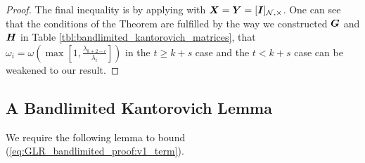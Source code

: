 \begin{proof}
The final inequality is by applying \cite[Theorem 5]{khatri1982some} with $\matr{X} = \matr{Y} = \matrsub[N,\Theta]{I}$. One can see that the conditions of the Theorem are fulfilled by the way we constructed $\bm{G}$ and $\bm{H}$ in Table \ref{tbl:bandlimited_kantorovich_matrices}, that $\omega_{i} = \omega\left(\max\left[1,\frac{\lambda_{k+2-i}}{\lambda_{i}}\right]\right)$ in the $t \geq k+s$ case and the  $t < k+s$ case can be weakened to our result.
\end{proof}

\subsection{A Bandlimited Kantorovich Lemma}
We require the following lemma to bound (\ref{eq:GLR_bandlimited_proof:v1_term}).

